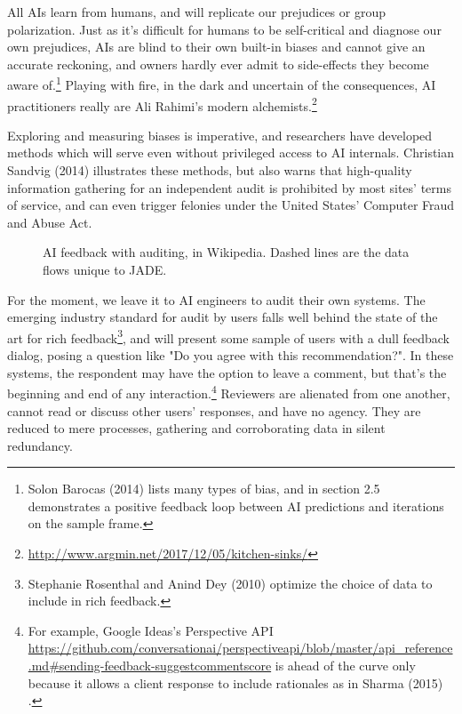 \documentclass[format=sigconf]{acmart}
\begin{document}
All AIs learn from humans, and will replicate our prejudices or group polarization.  Just as it's difficult for humans to be self-critical and diagnose our own prejudices, AIs are blind to their own built-in biases and cannot give an accurate reckoning, and owners hardly ever admit to side-effects they become aware of.\footnote{Solon Barocas (2014) \citep{barocas2014data} lists many types of bias, and in section 2.5 demonstrates a positive feedback loop between AI predictions and iterations on the sample frame.}  Playing with fire, in the dark and uncertain of the consequences, AI practitioners really are Ali Rahimi's modern alchemists.\footnote{\url{http://www.argmin.net/2017/12/05/kitchen-sinks/}}

Exploring and measuring biases is imperative, and researchers have developed methods which will serve even without privileged access to AI internals.  Christian Sandvig (2014) \citep{Sandvig} illustrates these methods, but also warns that high-quality information gathering for an independent audit is prohibited by most sites' terms of service, and can even trigger felonies under the United States' Computer Fraud and Abuse Act.

\begin{figure}
  
  \caption{AI feedback with auditing, in Wikipedia.  Dashed lines are the data flows unique to JADE.}\label{fig:audited}
\end{figure}

For the moment, we leave it to AI engineers to audit their own systems.  The emerging industry standard for audit by users falls well behind the state of the art for rich feedback\footnote{Stephanie Rosenthal and Anind Dey (2010) \citep{Rosenthal2010} optimize the choice of data to include in rich feedback.}, and will present some sample of users with a dull feedback dialog, posing a question like "Do you agree with this recommendation?".  In these systems, the respondent may have the option to leave a comment, but that's the beginning and end of any interaction.\footnote{For example, Google Ideas's Perspective API \url{https://github.com/conversationai/perspectiveapi/blob/master/api\_reference.md\#sending-feedback-suggestcommentscore} is ahead of the curve only because it allows a client response to include rationales as in Sharma (2015) \citep{Sharma2015}.}  Reviewers are alienated from one another, cannot read or discuss other users' responses, and have no agency.  They are reduced to mere processes, gathering and corroborating data in silent redundancy.
\end{document}
